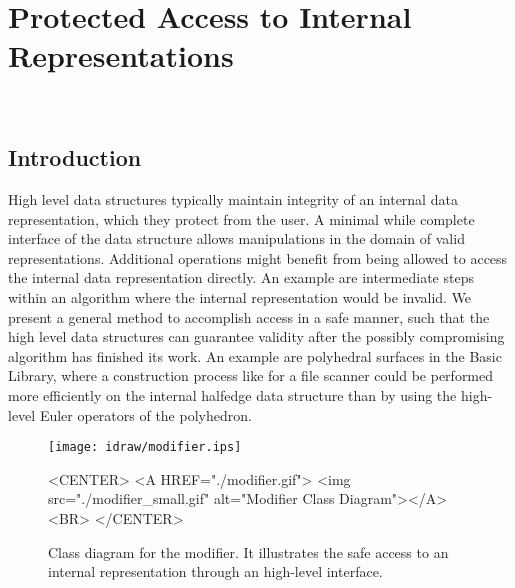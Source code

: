 
\beforecprogskip\medskipamount
\aftercprogskip\medskipamount
\ccParDims

\chapter{Protected Access to Internal Representations}
\label{chapterModifier}
\\

\section{Introduction}

High level data structures typically maintain integrity of an internal
data representation, which they protect from the user. A minimal while
complete interface of the data structure allows manipulations in the
domain of valid representations. Additional operations might benefit
from being allowed to access the internal data representation
directly. An example are intermediate steps within an algorithm where
the internal representation would be invalid. We present a general
method to accomplish access in a safe manner, such that the high level
data structures can guarantee validity after the possibly compromising
algorithm has finished its work. An example are polyhedral surfaces in
the Basic Library, where a construction process like for
a file scanner could be performed more efficiently on the internal
halfedge data structure than by using the high-level Euler operators
of the polyhedron.

\begin{figure}
\begin{ccTexOnly}
    \begin{center}
      \parbox{\textwidth}{%
          \texttt{[image: idraw/modifier.ips]}%
      }
    \end{center}
\end{ccTexOnly}

    \caption{Class diagram for the modifier. It illustrates the
             safe access to an internal representation through an
             high-level interface.}
    \label{figureModifierDesign}

\begin{ccHtmlOnly}
    <CENTER>
    <A HREF="./modifier.gif">
        <img src="./modifier_small.gif" alt="Modifier Class Diagram"></A><BR>
    </CENTER>
\end{ccHtmlOnly}
\end{figure}


